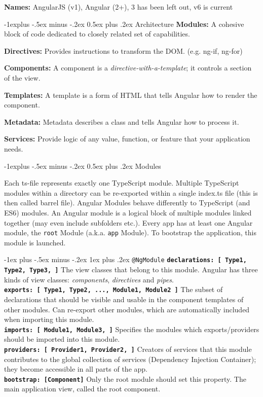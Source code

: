 \documentclass[a4paper, fontsize=6pt]{scrartcl}
\makeatletter
\renewcommand{\subsection}{\@startsection{subsection}{2}{0mm}%
    {-1explus -.5ex minus -.2ex}%
    {0.5ex plus .2ex}%
    {\normalfont\normalsize\bfseries}}
\renewcommand{\subsubsection}{\@startsection{subsubsection}{3}{0mm}%
    {-1ex plus -.5ex minus -.2ex}%
    {1ex plus .2ex}%
    {\normalfont\small\bfseries}}
\newcommand{\js}[1]{\texttt{#1}}
\makeatother
\begin{document}
\begin{multicols*}{5}
\textbf{Names:} AngularJS (v1), Angular (2+), 3 has been left out, v6 is current

\subsection{Architecture}
\textbf{Modules:} A cohesive block of code dedicated to closely related set of capabilities.

\textbf{Directives:} Provides instructions to transform the DOM. (e.g. ng-if, ng-for)

\textbf{Components:} A component is a \textit{directive-with-a-template}; it controls a section of the view.

\textbf{Templates:} A template is a form of HTML that tells Angular how to render the component.

\textbf{Metadata:} Metadata describes a class and tells Angular how to process it.

\textbf{Services:} Provide logic of any value, function, or feature that your application needs.

\subsection{Modules}

Each ts-file represents exactly one TypeScript module. Multiple TypeScript modules within a directory can be re-exported within a single index.ts file (this is then called barrel file). Angular Modules behave differently to TypeScript (and ES6) modules. An Angular module is a logical block of multiple modules linked together (may even include subfolders etc.). Every app has at least one Angular module, the \js{root} Module (a.k.a. \js{app} Module). To bootstrap the application, this module is launched.

\subsubsection{\js{@NgModule}}
\textbf{\js{declarations: [ Type1, Type2, Type3, ]}} The view classes that belong to this module. Angular has three kinds of view classes: \textit{components}, \textit{directives} and \textit{pipes}.\\
\textbf{\js{exports: [ Type1, Type2, ..., Module1, Module2 ]}} The subset of declarations that should be visible and usable in the component templates of other modules. Can re-export other modules, which are automatically included when importing this module.\\
\textbf{\js{imports: [ Module1, Module3, ]}} Specifies the modules which exports/providers should be imported into this module.\\
\textbf{\js{providers: [ Provider1, Provider2, ]}} Creators of services that this module contributes to the global collection of services (Dependency Injection Container); they become accessible in all parts of the app.\\
\textbf{\js{bootstrap: [Component]}} Only the root module should set this property. The main application view, called the root component.


\end{multicols*}
\end{document}
